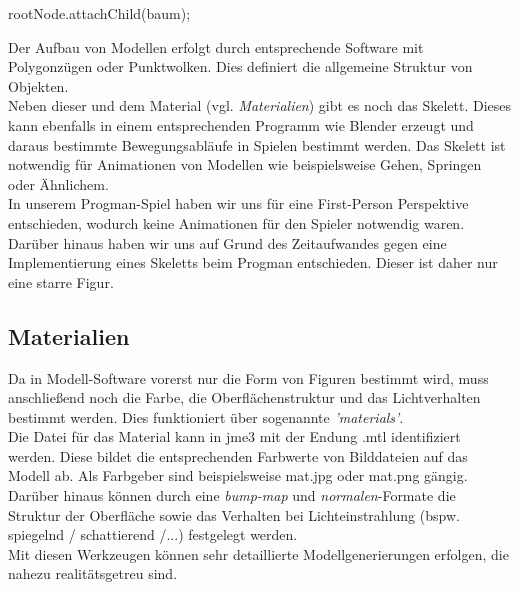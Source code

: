 \begin{center}
	{rootNode.attachChild(baum);}
\end{center} Der Aufbau von Modellen erfolgt durch entsprechende Software mit Polygonzügen oder Punktwolken. Dies definiert die allgemeine Struktur von Objekten.\\
Neben dieser und dem Material (vgl. \emph{Materialien}) gibt es noch das Skelett. Dieses kann ebenfalls in einem entsprechenden Programm wie Blender erzeugt und daraus bestimmte Bewegungsabläufe in Spielen bestimmt werden.
Das Skelett ist notwendig für Animationen von Modellen wie beispielsweise Gehen, Springen oder Ähnlichem.\\
In unserem Progman-Spiel haben wir uns für eine First-Person Perspektive entschieden, wodurch keine Animationen für den Spieler notwendig waren. Darüber hinaus haben wir uns auf Grund des Zeitaufwandes gegen eine Implementierung eines Skeletts beim Progman entschieden. Dieser ist daher nur eine starre Figur.



\subsection{Materialien}
Da in Modell-Software vorerst nur die Form von Figuren bestimmt wird, muss anschließend noch die Farbe, die Oberflächenstruktur und das Lichtverhalten bestimmt werden. Dies funktioniert über sogenannte \emph{'materials'}.\\
Die Datei für das Material kann in jme3 mit der Endung .mtl identifiziert werden. Diese bildet die entsprechenden Farbwerte von Bilddateien auf das Modell ab. Als Farbgeber sind beispielsweise mat.jpg oder mat.png gängig. Darüber hinaus können durch eine \emph{bump-map} und \emph{normalen}-Formate die Struktur der Oberfläche sowie das Verhalten bei Lichteinstrahlung (bspw. spiegelnd / schattierend /...) festgelegt werden. \\ Mit diesen Werkzeugen können sehr detaillierte Modellgenerierungen erfolgen, die nahezu realitätsgetreu sind.



